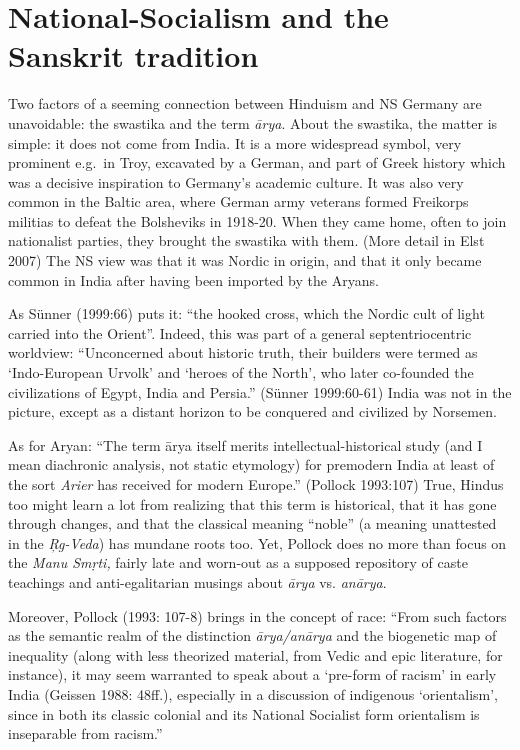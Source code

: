 \section*{National-Socialism and the Sanskrit tradition}

Two factors of a seeming connection between Hinduism and NS Germany are unavoidable: the swastika and the term {\sl ārya}. About the swastika, the matter is simple: it does not come from India. It is a more widespread symbol, very prominent e.g.\ in Troy, excavated by a German, and part of Greek history which was a decisive inspiration to Germany’s academic culture. It was also very common in the Baltic area, where German army veterans formed Freikorps militias to defeat the Bolsheviks in 1918-20. When they came home, often to join nationalist parties, they brought the swastika with them.  (More detail in Elst 2007) The NS view was that it was Nordic in origin, and that it only became common in India after having been imported by the Aryans.

As Sünner (1999:66) puts it: “the hooked cross, which the Nordic cult of light carried into the Orient”. Indeed, this was part of a general septentriocentric worldview: “Unconcerned about historic truth, their builders were termed as ‘Indo-European Urvolk’ and ‘heroes of the North’, who later co-founded the civilizations of Egypt, India and Persia.” (Sünner 1999:60-61) India was not in the picture, except as a distant horizon to be conquered and civilized by Norsemen.

As for Aryan: “The term ārya itself merits intellectual-historical study (and I mean diachronic analysis, not static etymology) for premodern India at least of the sort {\sl Arier} has received for modern Europe.” (Pollock 1993:107) True, Hindus too might learn a lot from realizing that this term is historical, that it has gone through changes, and that the classical meaning “noble” (a meaning unattested in the {\sl Ŗg-Veda}) has mundane roots too. Yet, Pollock does no more than focus on the {\sl Manu Smṛti,} fairly late and worn-out as a supposed repository of caste teachings and anti-egalitarian musings about {\sl ārya} vs. {\sl anārya}.

Moreover, Pollock (1993: 107-8) brings in the concept of race: 
“From such factors as the semantic realm of the distinction {\sl ārya/anārya} and the biogenetic map of inequality (along with less theorized material, from Vedic and epic literature, for instance), it may seem warranted to speak about a ‘pre-form of racism’ in early India (Geissen 1988: 48ff.), especially in a discussion of indigenous ‘orientalism’, since in both its classic colonial and its National Socialist form orientalism is inseparable from racism.” 

